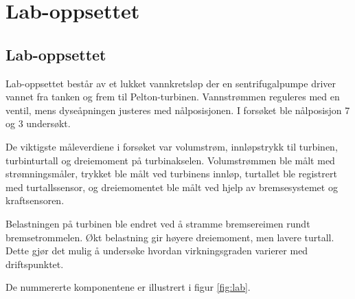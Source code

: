 \section*{Lab-oppsettet}
\setcounter{section}{2}

\setcounter{subsection}{0}
\subsection{Lab-oppsettet}

Lab-oppsettet består av et lukket vannkretsløp der en sentrifugalpumpe driver vannet fra tanken og frem til Pelton-turbinen. Vannstrømmen reguleres med en ventil, mens dyseåpningen justeres med nålposisjonen. I forsøket ble nålposisjon 7 og 3 undersøkt.

De viktigste måleverdiene i forsøket var volumstrøm, innløpstrykk til turbinen, turbinturtall og dreiemoment på turbinakselen. Volumstrømmen ble målt med strømningsmåler, trykket ble målt ved turbinens innløp, turtallet ble registrert med turtallssensor, og dreiemomentet ble målt ved hjelp av bremsesystemet og kraftsensoren.

Belastningen på turbinen ble endret ved å stramme bremsereimen rundt bremsetrommelen. Økt belastning gir høyere dreiemoment, men lavere turtall. Dette gjør det mulig å undersøke hvordan virkningsgraden varierer med driftspunktet.

De nummererte komponentene er illustrert i figur \ref{fig:lab}.

